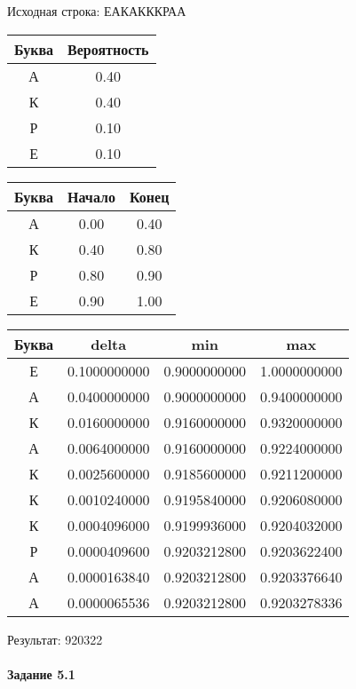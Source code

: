 \documentclass[a4paper, 12pt]{article}
\begin{document}
Исходная строка: ЕАКАКККРАА\
\begin{center}
 \begin{tabular}{ |c|c| } 
  \hline
     Буква & Вероятность \\ \hline
А & 0.40\\\hline
К & 0.40\\\hline
Р & 0.10\\\hline
Е & 0.10
\\ \hline \end{tabular}
\end{center}
\begin{center}
 \begin{tabular}{ |c|c|c| } 
  \hline
     Буква & Начало & Конец \\ \hline
А & 0.00 & 0.40\\\hline
К & 0.40 & 0.80\\\hline
Р & 0.80 & 0.90\\\hline
Е & 0.90 & 1.00
\\ \hline \end{tabular}
\end{center}
\begin{center}
 \begin{tabular}{ |c|c|c|c| } 
  \hline
     Буква & delta & min & max \\ \hline
Е & 0.1000000000 & 0.9000000000 & 1.0000000000\\\hline
А & 0.0400000000 & 0.9000000000 & 0.9400000000\\\hline
К & 0.0160000000 & 0.9160000000 & 0.9320000000\\\hline
А & 0.0064000000 & 0.9160000000 & 0.9224000000\\\hline
К & 0.0025600000 & 0.9185600000 & 0.9211200000\\\hline
К & 0.0010240000 & 0.9195840000 & 0.9206080000\\\hline
К & 0.0004096000 & 0.9199936000 & 0.9204032000\\\hline
Р & 0.0000409600 & 0.9203212800 & 0.9203622400\\\hline
А & 0.0000163840 & 0.9203212800 & 0.9203376640\\\hline
А & 0.0000065536 & 0.9203212800 & 0.9203278336
\\ \hline \end{tabular}
\end{center}
Результат: 920322
\pagebreak
\paragraph{Задание 5.1}
\end{document}
